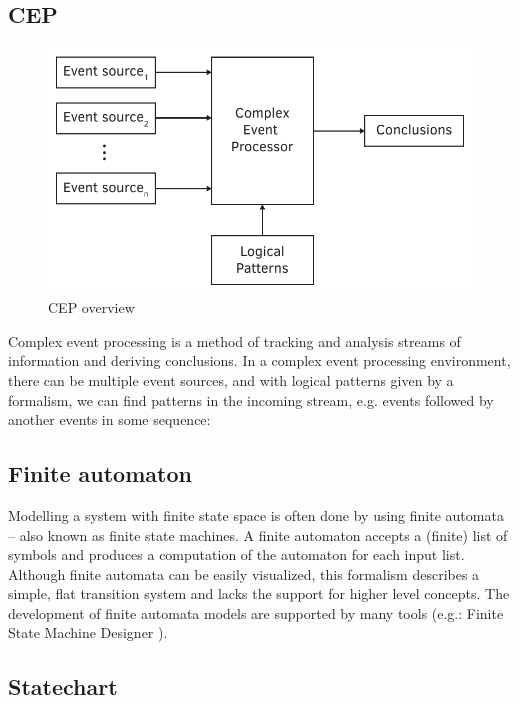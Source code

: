 \subsection*{CEP}

\begin{figure}[h]
	\centering
	\includegraphics[width=0.8\linewidth]{include/figures/chapter_1/CEP}
	\caption{CEP overview}
	\label{fig:intro:vmodel}
\end{figure}

Complex event processing is a method of tracking and analysis streams of information and deriving conclusions. In a complex event processing environment, there can be multiple event sources, and with logical patterns given by a formalism, we can find patterns in the incoming stream, e.g. events followed by another events in some sequence: \citep{epbas}

\subsection*{Finite automaton}

Modelling a system with finite state space is often done by using finite automata -- also known as finite state machines. A finite automaton accepts a (finite) list of symbols and produces a computation of the automaton for each input list.
Although finite automata can be easily visualized, this formalism describes a simple, flat transition system and lacks the support for higher level concepts. The development of finite automata models  are supported by many tools (e.g.: Finite State Machine Designer \citep{yakindu}).

\subsection*{Statechart}

